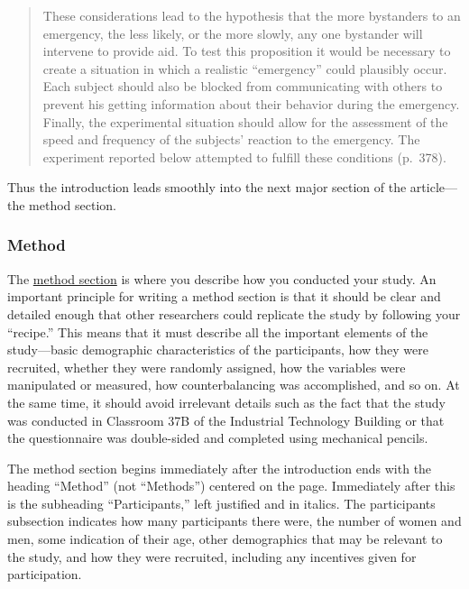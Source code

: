 \documentclass[
]{krantz}
\begin{document}
\begin{quote}
These considerations lead to the hypothesis that the more bystanders to an emergency, the less likely, or the more slowly, any one bystander will intervene to provide aid. To test this proposition it would be necessary to create a situation in which a realistic ``emergency'' could plausibly occur. Each subject should also be blocked from communicating with others to prevent his getting information about their behavior during the emergency. Finally, the experimental situation should allow for the assessment of the speed and frequency of the subjects' reaction to the emergency. The experiment reported below attempted to fulfill these conditions (p.~378).
\end{quote}

Thus the introduction leads smoothly into the next major section of the article---the method section.

\subsubsection*{Method}\label{method}


The \hyperref[method-section]{method section} is where you describe how you conducted your study. An important principle for writing a method section is that it should be clear and detailed enough that other researchers could replicate the study by following your ``recipe.'' This means that it must describe all the important elements of the study---basic demographic characteristics of the participants, how they were recruited, whether they were randomly assigned, how the variables were manipulated or measured, how counterbalancing was accomplished, and so on. At the same time, it should avoid irrelevant details such as the fact that the study was conducted in Classroom 37B of the Industrial Technology Building or that the questionnaire was double-sided and completed using mechanical pencils.

The method section begins immediately after the introduction ends with the heading ``Method'' (not ``Methods'') centered on the page. Immediately after this is the subheading ``Participants,'' left justified and in italics. The participants subsection indicates how many participants there were, the number of women and men, some indication of their age, other demographics that may be relevant to the study, and how they were recruited, including any incentives given for participation.
\end{document}
